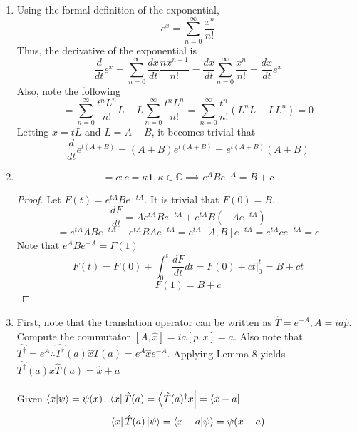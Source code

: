 \newpage
\begin{sol}
\begin{enumerate}[label=\textbf{(\alph*)}]
\item
Using the formal definition of the exponential, 
\begin{equation}
	e^{x}=\sum_{n=0}^\infty\frac{x^n}{n!}
\end{equation} 
Thus, the derivative of the exponential is
\begin{equation}
	\frac{d}{dt}e^x=\sum_{n=0}^\infty\frac{dx}{dt}\frac{nx^{n-1}}{n!}=\frac{dx}{dt}\sum_{n=0}^\infty\frac{x^n}{n!}=\frac{dx}{dt}e^x
\end{equation} 
Also, note the following
\begin{equation}
	[e^{tL},L]=\sum_{n=0}^\infty\frac{t^nL^n}{n!}L-L\sum_{n=0}^\infty\frac{t^nL^n}{n!}=\sum_{n=0}^\infty \frac{t^n}{n!}(L^nL-LL^n)=0
\end{equation}
Letting $x=tL$ and $L=A+B$, it becomes trivial that
\begin{equation}
	\frac{d}{dt}e^{t(A+B)}=(A+B)e^{t(A+B)}=e^{t(A+B)}(A+B)
\end{equation}
\item
\begin{lemma}
\begin{equation}
	[A,B]=c: c=\kappa\mathbf 1, \kappa\in\mathbb C\implies e^ABe^{-A}=B+c
\end{equation}
\end{lemma}
\begin{proof}
Let $F(t)=e^{tA}Be^{-tA}$. It is trivial that $F(0)=B$.
\begin{equation}
	\frac{dF}{dt}=Ae^{tA}Be^{-tA}+e^{tA}B(-Ae^{-tA})
\end{equation} \begin{equation}
	=e^{tA}ABe^{-tA}-e^{tA}BAe^{-tA}=e^{tA}[A,B]e^{-tA}=e^{tA}ce^{-tA}=c
\end{equation}
Note that $e^ABe^{-A}=F(1)$
\begin{equation}
	F(t)=F(0)+\int_0^t\frac{dF}{dt}dt=F(0)+ct|_0^t=B+ct
\end{equation} 
\begin{equation}
	F(1)=B+c
\end{equation} 
\end{proof}
\item
First, note that the translation operator can be written as $\hat T=e^{-A}, A=ia\hat p$.\\
Compute the commutator $[A,\hat x]=ia[p,x]=a$. Also note that $\hat{ T^\dagger}=e^A\therefore\hat{ T^\dagger}(a)\hat x\hat T(a)=e^A\hat x e^{-A}$. Applying Lemma 8 yields $\hat{ T^\dagger}(a)\hat x\hat T(a)=\hat x+a$\\\\
Given $\braket{x}{\psi}=\psi(x)$, $\bra x\hat T(a)=\bra{\hat T(a)^\dagger x}=\bra{x-a}$
\begin{equation}
	\bra x\hat T(a)\ket\psi=\braket{x-a}{\psi}=\psi(x-a)
\end{equation}
\end{enumerate}
\end{sol}